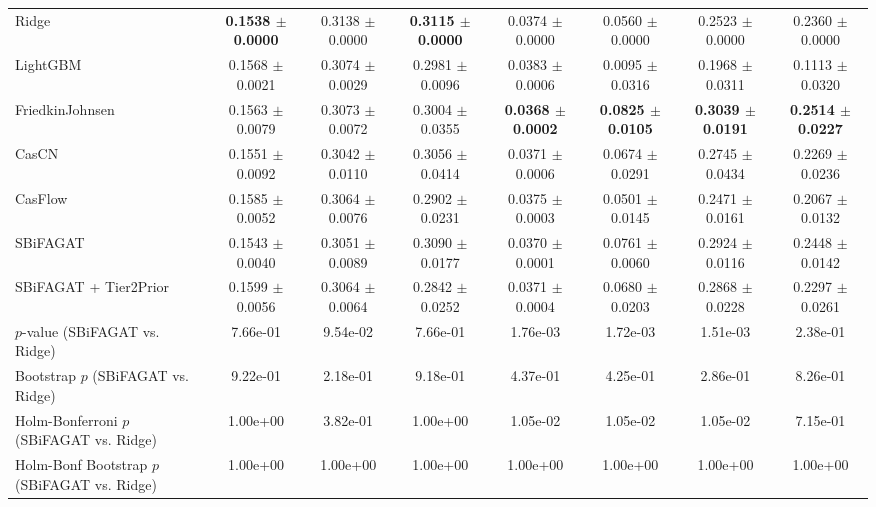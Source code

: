\begin{table}[t]
{\begin{tabular}{lccccccc}
Ridge & \textbf{0.1538 $\pm$ 0.0000} & 0.3138 $\pm$ 0.0000 & \textbf{0.3115 $\pm$ 0.0000} & 0.0374 $\pm$ 0.0000 & 0.0560 $\pm$ 0.0000 & 0.2523 $\pm$ 0.0000 & 0.2360 $\pm$ 0.0000 \\
LightGBM & 0.1568 $\pm$ 0.0021 & 0.3074 $\pm$ 0.0029 & 0.2981 $\pm$ 0.0096 & 0.0383 $\pm$ 0.0006 & 0.0095 $\pm$ 0.0316 & 0.1968 $\pm$ 0.0311 & 0.1113 $\pm$ 0.0320 \\
FriedkinJohnsen & 0.1563 $\pm$ 0.0079 & 0.3073 $\pm$ 0.0072 & 0.3004 $\pm$ 0.0355 & \textbf{0.0368 $\pm$ 0.0002} & \textbf{0.0825 $\pm$ 0.0105} & \textbf{0.3039 $\pm$ 0.0191} & \textbf{0.2514 $\pm$ 0.0227} \\
CasCN & 0.1551 $\pm$ 0.0092 & 0.3042 $\pm$ 0.0110 & 0.3056 $\pm$ 0.0414 & 0.0371 $\pm$ 0.0006 & 0.0674 $\pm$ 0.0291 & 0.2745 $\pm$ 0.0434 & 0.2269 $\pm$ 0.0236 \\
CasFlow & 0.1585 $\pm$ 0.0052 & 0.3064 $\pm$ 0.0076 & 0.2902 $\pm$ 0.0231 & 0.0375 $\pm$ 0.0003 & 0.0501 $\pm$ 0.0145 & 0.2471 $\pm$ 0.0161 & 0.2067 $\pm$ 0.0132 \\
SBiFAGAT & 0.1543 $\pm$ 0.0040 & 0.3051 $\pm$ 0.0089 & 0.3090 $\pm$ 0.0177 & 0.0370 $\pm$ 0.0001 & 0.0761 $\pm$ 0.0060 & 0.2924 $\pm$ 0.0116 & 0.2448 $\pm$ 0.0142 \\
SBiFAGAT + Tier2Prior & 0.1599 $\pm$ 0.0056 & 0.3064 $\pm$ 0.0064 & 0.2842 $\pm$ 0.0252 & 0.0371 $\pm$ 0.0004 & 0.0680 $\pm$ 0.0203 & 0.2868 $\pm$ 0.0228 & 0.2297 $\pm$ 0.0261 \\
\midrule
$p$-value (SBiFAGAT vs. Ridge) & 7.66e-01 & 9.54e-02 & 7.66e-01 & 1.76e-03 & 1.72e-03 & 1.51e-03 & 2.38e-01 \\
Bootstrap $p$ (SBiFAGAT vs. Ridge) & 9.22e-01 & 2.18e-01 & 9.18e-01 & 4.37e-01 & 4.25e-01 & 2.86e-01 & 8.26e-01 \\
Holm-Bonferroni $p$ (SBiFAGAT vs. Ridge) & 1.00e+00 & 3.82e-01 & 1.00e+00 & 1.05e-02 & 1.05e-02 & 1.05e-02 & 7.15e-01 \\
Holm-Bonf Bootstrap $p$ (SBiFAGAT vs. Ridge) & 1.00e+00 & 1.00e+00 & 1.00e+00 & 1.00e+00 & 1.00e+00 & 1.00e+00 & 1.00e+00 \\
\bottomrule
\end{tabular}
}
\end{table}
